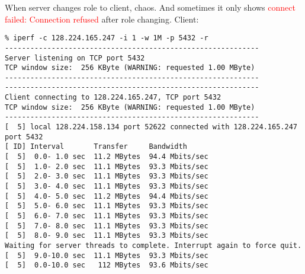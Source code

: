 \documentclass[a4paper]{report}
\begin{document}
When server changes role to client, chaos. And sometimes it only shows 
\textcolor{red}{connect failed: Connection refused} after role changing.
Client:
\begin{lstlisting}
% iperf -c 128.224.165.247 -i 1 -w 1M -p 5432 -r
------------------------------------------------------------
Server listening on TCP port 5432
TCP window size:  256 KByte (WARNING: requested 1.00 MByte)
------------------------------------------------------------
------------------------------------------------------------
Client connecting to 128.224.165.247, TCP port 5432
TCP window size:  256 KByte (WARNING: requested 1.00 MByte)
------------------------------------------------------------
[  5] local 128.224.158.134 port 52622 connected with 128.224.165.247 port 5432
[ ID] Interval       Transfer     Bandwidth
[  5]  0.0- 1.0 sec  11.2 MBytes  94.4 Mbits/sec
[  5]  1.0- 2.0 sec  11.1 MBytes  93.3 Mbits/sec
[  5]  2.0- 3.0 sec  11.1 MBytes  93.3 Mbits/sec
[  5]  3.0- 4.0 sec  11.1 MBytes  93.3 Mbits/sec
[  5]  4.0- 5.0 sec  11.2 MBytes  94.4 Mbits/sec
[  5]  5.0- 6.0 sec  11.1 MBytes  93.3 Mbits/sec
[  5]  6.0- 7.0 sec  11.1 MBytes  93.3 Mbits/sec
[  5]  7.0- 8.0 sec  11.1 MBytes  93.3 Mbits/sec
[  5]  8.0- 9.0 sec  11.1 MBytes  93.3 Mbits/sec
Waiting for server threads to complete. Interrupt again to force quit.
[  5]  9.0-10.0 sec  11.1 MBytes  93.3 Mbits/sec
[  5]  0.0-10.0 sec   112 MBytes  93.6 Mbits/sec
\end{lstlisting}
\end{document}
